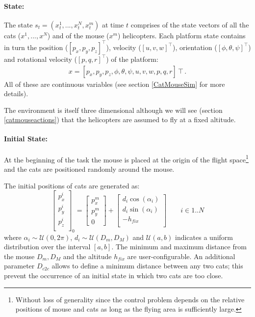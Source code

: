 \documentclass[a4paper,11pt]{report}
\begin{document}
\paragraph{State:} The state $s_t = (x^1_t,...,x^{N}_t,x^m_t)$ at time $t$ comprises of the state vectors of all the cats ($x^1,...,x^{N}$) and of the mouse ($x^m$) helicopters. 
Each platform state contains in turn the position ($[p_x,p_y,p_z]^\intercal$), velocity ($[u,v,w]^\intercal$), orientation ($[\phi,\theta,\psi]^\intercal$) and rotational velocity ($[p,q,r]^\intercal$) of the platform:
\begin{align}
x = [p_x,p_y,p_z,\phi,\theta,\psi,u,v,w,p,q,r]\intercal .
\end{align}
 All of these are continuous variables (see section \ref{CatMouseSim} for more details).

The environment is itself three dimensional although we will see (section \ref{catmouseactions}) that the helicopters are assumed to fly at a fixed altitude.

\paragraph{Initial State:} At the beginning of the task the mouse is placed at the origin of the flight space\footnote{Without loss of generality since the control problem depends on the relative positions of mouse and cats as long as the flying area is sufficiently large.} and the cats are positioned randomly around the mouse.

The initial positions of cats are generated as:
$$
\left[
\begin{array}{l}
p^i_x \\
p^i_y \\
p^i_z \\
\end{array}
\right]_0
= \left[
 \begin{array}{l}
 p^m_x \\
 p^m_y \\
 0 
 \end{array}
 \right] + 
 \left[
 \begin{array}{l}
d_i \cos(\alpha_i) \\
d_i \sin(\alpha_i) \\
- h_{fix} \\
\end{array}
\right] \qquad i \in 1..N
$$
where $\alpha_i \sim \mathcal{U}(0,2\pi)$, $d_i \sim \mathcal{U}(D_m,D_M)$ and $\mathcal{U}(a,b)$ indicates a uniform distribution over the interval $[a,b]$. The minimum and maximum distance from the mouse $D_m,D_M$ and the altitude $h_{fix}$ are user-configurable.
An additional parameter $D_{c2c}$ allows to define a minimum distance between any two cats; this prevent the occurrence of an initial state in which two cats are too close.
\end{document}
